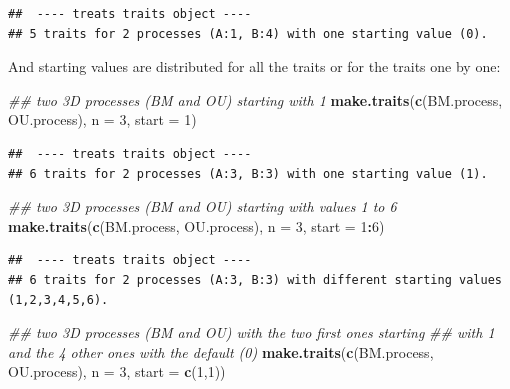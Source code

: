 \documentclass[
]{book}
\newenvironment{Shaded}{\begin{snugshade}}{\end{snugshade}}
\newcommand{\CommentTok}[1]{\textcolor[rgb]{0.56,0.35,0.01}{\textit{#1}}}
\newcommand{\DataTypeTok}[1]{\textcolor[rgb]{0.13,0.29,0.53}{#1}}
\newcommand{\DecValTok}[1]{\textcolor[rgb]{0.00,0.00,0.81}{#1}}
\newcommand{\KeywordTok}[1]{\textcolor[rgb]{0.13,0.29,0.53}{\textbf{#1}}}
\newcommand{\NormalTok}[1]{#1}
\newcommand{\OperatorTok}[1]{\textcolor[rgb]{0.81,0.36,0.00}{\textbf{#1}}}
\begin{document}
\begin{verbatim}
##  ---- treats traits object ---- 
## 5 traits for 2 processes (A:1, B:4) with one starting value (0).
\end{verbatim}

And starting values are distributed for all the traits or for the traits one by one:

\begin{Shaded}
\begin{Highlighting}[]
\CommentTok{\#\# two 3D processes (BM and OU) starting with 1}
\KeywordTok{make.traits}\NormalTok{(}\KeywordTok{c}\NormalTok{(BM.process, OU.process), }\DataTypeTok{n =} \DecValTok{3}\NormalTok{, }\DataTypeTok{start =} \DecValTok{1}\NormalTok{)}
\end{Highlighting}
\end{Shaded}

\begin{verbatim}
##  ---- treats traits object ---- 
## 6 traits for 2 processes (A:3, B:3) with one starting value (1).
\end{verbatim}

\begin{Shaded}
\begin{Highlighting}[]
\CommentTok{\#\# two 3D processes (BM and OU) starting with values 1 to 6}
\KeywordTok{make.traits}\NormalTok{(}\KeywordTok{c}\NormalTok{(BM.process, OU.process), }\DataTypeTok{n =} \DecValTok{3}\NormalTok{, }\DataTypeTok{start =} \DecValTok{1}\OperatorTok{:}\DecValTok{6}\NormalTok{)}
\end{Highlighting}
\end{Shaded}

\begin{verbatim}
##  ---- treats traits object ---- 
## 6 traits for 2 processes (A:3, B:3) with different starting values (1,2,3,4,5,6).
\end{verbatim}

\begin{Shaded}
\begin{Highlighting}[]
\CommentTok{\#\# two 3D processes (BM and OU) with the two first ones starting}
\CommentTok{\#\# with 1 and the 4 other ones with the default (0)}
\KeywordTok{make.traits}\NormalTok{(}\KeywordTok{c}\NormalTok{(BM.process, OU.process), }\DataTypeTok{n =} \DecValTok{3}\NormalTok{, }\DataTypeTok{start =} \KeywordTok{c}\NormalTok{(}\DecValTok{1}\NormalTok{,}\DecValTok{1}\NormalTok{))}
\end{Highlighting}
\end{Shaded}
\end{document}
